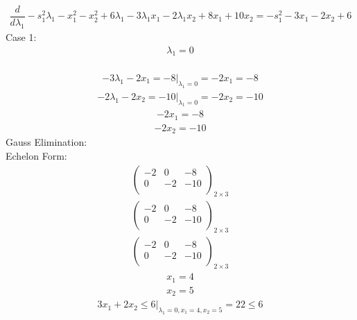 \documentclass{article}
\begin{document}
\begin{align*}
\dfrac{d}{d\lambda_{1}}-s_{1}^{2}\lambda_{1} - x_{1}^{2} - x_{2}^{2} + 6\lambda_{1} - 3\lambda_{1}x_{1} - 2\lambda_{1}x_{2} + 8x_{1} + 10x_{2}=-s_{1}^{2} - 3x_{1} - 2x_{2} + 6\end{align*}
Case 1: \begin{align*}
\lambda_{1}=0\end{align*}
 \\
\begin{align*}
\left.-3\lambda_{1} - 2x_{1}=-8\right|_{\lambda_{1}=0}=-2x_{1}=-8\end{align*}
\begin{align*}
\left.-2\lambda_{1} - 2x_{2}=-10\right|_{\lambda_{1}=0}=-2x_{2}=-10\end{align*}
\begin{align*}
-2x_{1}=-8\end{align*}
\begin{align*}
-2x_{2}=-10\end{align*}
Gauss Elimination:\\
Echelon Form:\\
\begin{align*}
\left(
\begin{array}{cc|c}
-2 & 0 & -8\\
0 & -2 & -10\\
\end{array}
\right)_{2\times 3}
\end{align*}
\begin{align*}
\left(
\begin{array}{cc|c}
-2 & 0 & -8\\
0 & -2 & -10\\
\end{array}
\right)_{2\times 3}
\end{align*}
\begin{align*}
\left(
\begin{array}{cc|c}
-2 & 0 & -8\\
0 & -2 & -10\\
\end{array}
\right)_{2\times 3}
\end{align*}
\begin{align*}
x_{1}=4\end{align*}
\begin{align*}
x_{2}=5\end{align*}
\begin{align*}
\left.3x_{1} + 2x_{2}\le6\right|_{\lambda_{1}=0,x_{1}=4,x_{2}=5}=22\le6\end{align*}
\end{document}
